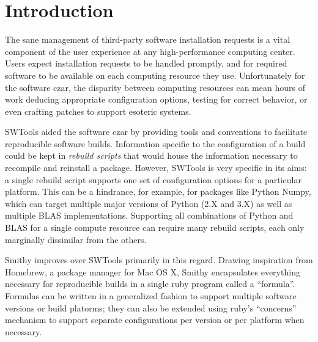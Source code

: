 \documentclass{acm_proc_article-sp}
\begin{document}



\section{Introduction}

The sane management of third-party software installation requests is a vital
component of the user experience at any high-performance computing center. Users
expect installation requests to be handled promptly, and for required software
to be available on each computing resource they use. Unfortunately for the
software czar, the disparity between computing resources can mean hours of work
deducing appropriate configuration options, testing for correct behavior, or
even crafting patches to support esoteric systems.

SWTools\cite{swtools} aided the software czar by providing tools and conventions
to facilitate reproducible software builds. Information specific to the
configuration of a build could be kept in \textit{rebuild scripts} that would
house the information necessary to recompile and reinstall a package.  However,
SWTools is very specific in its aims: a single rebuild script supports one set
of configuration options for a particular platform. This can be a hindrance, for
example, for packages like Python Numpy, which can target multiple major
versions of Python (2.X and 3.X) as well as multiple BLAS implementations.
Supporting all combinations of Python and BLAS for a single compute resource can
require many rebuild scripts, each only marginally dissimilar from the others.

Smithy improves over SWTools primarily in this regard. Drawing inspiration from
Homebrew\cite{homebrew}, a package manager for Mac OS X, Smithy encapsulates
everything necessary for reproducible builds in a single ruby program called a
``formula''. Formulas can be written in a generalized fashion to support
multiple software versions or build platorms; they can also be extended using
ruby's ``concerns'' mechanism to support separate configurations per version or
per platform when necessary.
\end{document}
